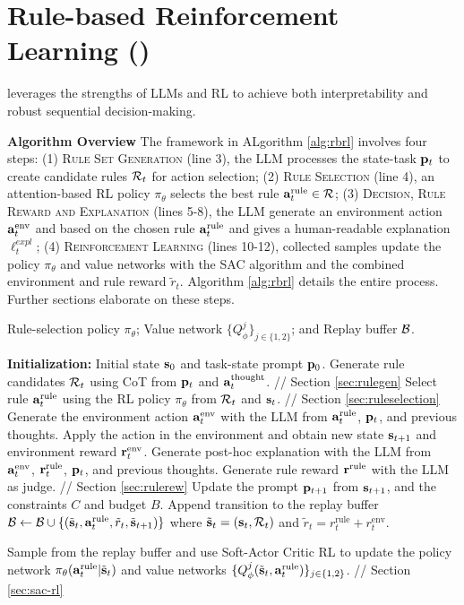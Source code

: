 
\section{Rule-based Reinforcement Learning (\rbrl)}
\label{sec:rbrl}


\rbrl  leverages the strengths of LLMs and RL to achieve both interpretability and robust sequential decision-making.




\textbf{Algorithm Overview}\quad
The \rbrl framework in ALgorithm \ref{alg:rbrl} involves four steps: (1) \textsc{Rule Set Generation} (line 3), the LLM processes the state-task ${\mathbf{p}}_t$ to create candidate rules ${\mathcal{R}}_t$ for action selection; (2) \textsc{Rule Selection} (line 4), an attention-based RL policy $\pi_{\theta}$ selects the best rule ${\mathbf{a}}^{\text{rule}}_t\in{\mathcal{R}}$; (3) \textsc{Decision, Rule Reward and Explanation} (lines 5-8), the LLM generate an environment action ${\mathbf{a}}^{\text{env}}_t$ and based on the chosen rule ${\mathbf{a}}^{\text{rule}}_t$ and gives a human-readable explanation $\pmb{\ell}_t^{expl}$; (4) \textsc{Reinforcement Learning} (lines 10-12), collected samples update the policy $\pi_\theta$ and value networks with the SAC algorithm \cite{haarnoja2018soft} and the combined environment and rule reward $\tilde{r}_t$. Algorithm \ref{alg:rbrl} details the entire process. Further sections elaborate on these steps.

\begin{algorithm}[h]
\caption{\rbrl}
\begin{algorithmic}[1]
\REQUIRE 
Rule-selection policy $\pi_\theta$; Value network $\{Q^j_\phi\}_{j\in\{1,2\}}$; and Replay buffer ${\mathcal{B}}$.

\STATE \textbf{Initialization:} Initial state ${\mathbf{s}}_0$ and task-state prompt ${\mathbf{p}}_0$.
\STATE Generate rule candidates ${\mathcal{R}}_t$ using CoT from ${\mathbf{p}}_t$ and ${\mathbf{a}}^{\text{thought}}_t$. {// Section \ref{sec:rulegen}}
\STATE Select rule ${\mathbf{a}}^{\text{rule}}_t$ using the RL policy $\pi_\theta$ from ${\mathcal{R}}_t$ and ${\mathbf{s}}_t$. {// Section \ref{sec:ruleselection}}
\STATE Generate the environment action ${\mathbf{a}}^{\text{env}}_t$ with the LLM from ${\mathbf{a}}^{\text{rule}}_t$, ${\mathbf{p}}_t$, and previous thoughts.
\STATE Apply the action in the environment and obtain new state ${\mathbf{s}}_{t+1}$ and environment reward ${\mathbf{r}}^{\text{env}}_t$.
\STATE Generate post-hoc explanation with the LLM from ${\mathbf{a}}^{\text{env}}_t$, ${\mathbf{r}}^{\text{rule}}_t$, ${\mathbf{p}}_t$, and previous thoughts.
\STATE Generate rule reward ${\mathbf{r}}^{\text{rule}}$ with the LLM as judge. {// Section \ref{sec:rulerew}}
\STATE Update the prompt ${\mathbf{p}}_{t+1}$ from ${\mathbf{s}}_{t+1}$, and the constraints $C$ and budget $B$.
\STATE Append transition to the replay buffer ${\mathcal{B}} \leftarrow {\mathcal{B}} \cup\{(\tilde{{\mathbf{s}}}_t, {\mathbf{a}}^{\text{rule}}_t, \tilde{r}_t, \tilde{{\mathbf{s}}}_{t+1})\}$ where $\tilde{{\mathbf{s}}}_t=({\mathbf{s}}_t, {\mathcal{R}}_t)$ and $\tilde{r}_t=r^{\text{rule}}_t + r^{\text{env}}_t$.

\STATE Sample from the replay buffer and use Soft-Actor Critic RL to update the policy network $\pi_\theta({\mathbf{a}}^{\text{rule}}_t | \tilde{{\mathbf{s}}}_t)$ and value networks $\{Q^j_\phi(\tilde{{\mathbf{s}}}_t, {\mathbf{a}}^{\text{rule}}_t)\}_{j\in\{1,2\}}$. {// Section \ref{sec:sac-rl}}
\ENDIF
\ENDFOR
\label{alg:rbrl}
\end{algorithmic}
\end{algorithm}







